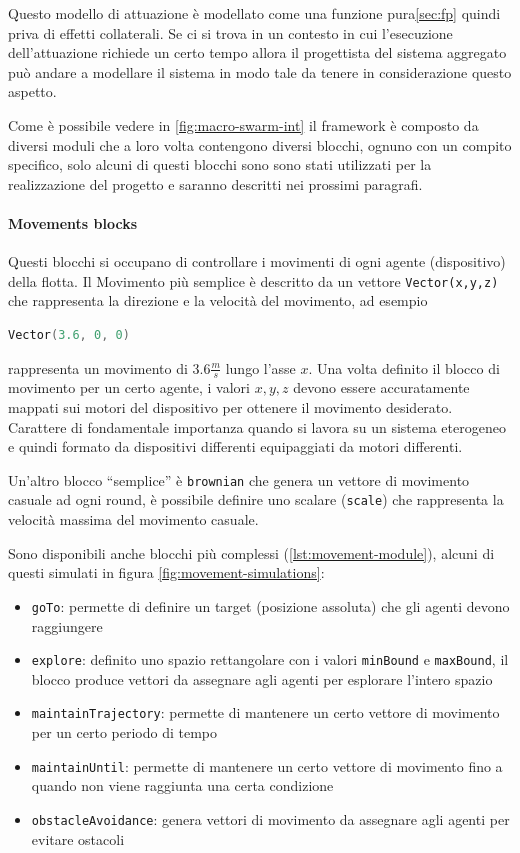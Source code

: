 \documentclass[12pt,a4paper,openright,twoside]{book}
\begin{document}
Questo modello di attuazione è modellato come una funzione pura\cref{sec:fp} quindi priva di effetti collaterali. Se ci si trova in un contesto in cui l'esecuzione dell'attuazione richiede un certo tempo allora il progettista del sistema aggregato può andare a modellare il sistema in modo tale da tenere in considerazione questo aspetto.

Come è possibile vedere in \cref{fig:macro-swarm-int} \cite{Macroswarm} il framework è composto da diversi moduli che a loro volta contengono diversi blocchi, ognuno con un compito specifico, solo alcuni di questi blocchi sono sono stati utilizzati per la realizzazione del progetto e saranno descritti nei prossimi paragrafi.

\paragraph{Movements blocks} 
Questi blocchi si occupano di controllare i movimenti di ogni agente (dispositivo) della flotta. Il Movimento più semplice è descritto da un vettore \verb|Vector(x,y,z)| che rappresenta la direzione e la velocità del movimento, ad esempio 

\begin{lstlisting}[language=Scala, label={lst:vector-example}]
    Vector(3.6, 0, 0)
\end{lstlisting}

rappresenta un movimento di $3.6 \frac{m}{s}$ lungo l'asse $x$. Una volta definito il blocco di movimento per un certo agente, i valori $x,y,z$ devono essere accuratamente mappati sui motori del dispositivo per ottenere il movimento desiderato. Carattere di fondamentale importanza quando si lavora su un sistema eterogeneo e quindi formato da dispositivi differenti equipaggiati da motori differenti.

Un'altro blocco ``semplice'' è \verb|brownian| che genera un vettore di movimento casuale ad ogni round, è possibile definire uno scalare (\verb|scale|) che rappresenta la velocità massima del movimento casuale.

Sono disponibili anche blocchi più complessi (\cref{lst:movement-module}), alcuni di questi simulati in figura \cref{fig:movement-simulations}:
\begin{itemize}
    \item \verb|goTo|: permette di definire un target (posizione assoluta) che gli agenti devono raggiungere
    \item \verb|explore|: definito uno spazio rettangolare con i valori \verb|minBound| e \verb|maxBound|, il blocco produce vettori da assegnare agli agenti per esplorare l'intero spazio
    \item \verb|maintainTrajectory|: permette di mantenere un certo vettore di movimento per un certo periodo di tempo
    \item \verb|maintainUntil|: permette di mantenere un certo vettore di movimento fino a quando non viene raggiunta una certa condizione
    \item \verb|obstacleAvoidance|: genera vettori di movimento da assegnare agli agenti per evitare ostacoli
\end{itemize}
\end{document}
